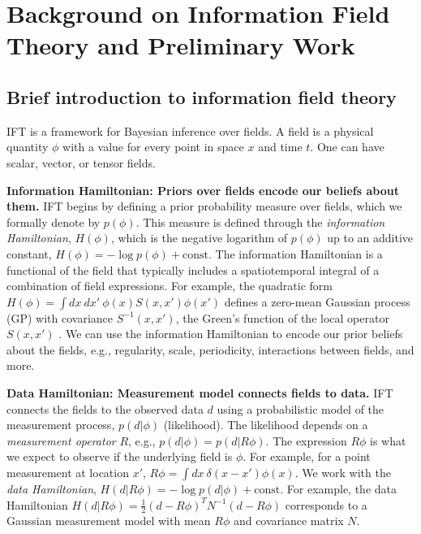 \section{Background on Information Field Theory and Preliminary Work\label{sec:prelim}}

\subsection{Brief introduction to information field theory}
\label{sec:IFTreview}
IFT is a framework for Bayesian inference over fields.
A field is a physical quantity $\phi$ with a value for every point in space $x$ and time $t$.
One can have scalar, vector, or tensor fields.

\textbf{Information Hamiltonian: Priors over fields encode our beliefs about them.} IFT begins by defining a prior probability measure over fields, which we formally denote by $p(\phi)$.
This measure is defined through the \textit{information Hamiltonian}, $H(\phi)$, which is the negative logarithm of $p(\phi)$ up to an additive constant, $H(\phi) = -\log p(\phi) + \text{const}.$
The information Hamiltonian is a functional of the field that typically includes a spatiotemporal integral of a combination of field expressions. 
For example, the quadratic form $H(\phi) = \int dx\: dx'\: \phi(x)S(x,x')\phi(x')$ defines a zero-mean Gaussian process (GP) with covariance $S^{-1}(x,x')$, the Green's function of the local operator $S(x,x')$ \cite{ensslin2019information}.
We can use the information Hamiltonian to encode our prior beliefs about the fields, e.g., regularity, scale, periodicity, interactions between fields, and more.

\textbf{Data Hamiltonian: Measurement model connects fields to data.} IFT connects the fields to the observed data $d$ using a probabilistic model of the measurement process, $p(d|\phi)$ (likelihood).
The likelihood depends on a \emph{measurement operator} $R$, e.g., $p(d|\phi)=p(d|R\phi)$.
The expression $R\phi$ is what we expect to observe if the underlying field is $\phi$.
For example, for a point measurement at location $x'$, $R\phi = \int dx \: \delta(x-x')\phi(x)$.
We work with the \emph{data Hamiltonian}, $H(d|R\phi) = -\log p(d|\phi) + \text{const}$.
For example, the data Hamiltonian $H(d|R\phi) = \frac{1}{2}(d-R\phi)^TN^{-1}(d-R\phi)$ corresponds to a Gaussian measurement model with mean $R\phi$ and covariance matrix $N$.

